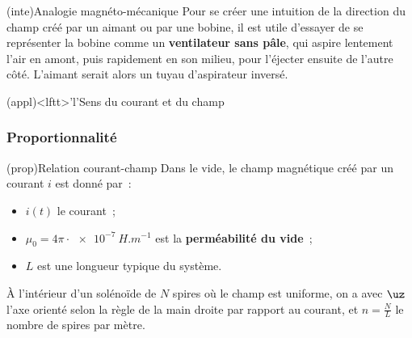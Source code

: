 \documentclass[../../main/main.tex]{subfiles}
\begin{document}
\begin{tcb*}(inte){Analogie magnéto-mécanique}
	Pour se créer une intuition de la direction du champ créé par un aimant ou par
	une bobine, il est utile d'essayer de se représenter la bobine comme un
	\textbf{ventilateur sans pâle}, qui aspire lentement l'air en amont, puis
	rapidement en son milieu, pour l'éjecter ensuite de l'autre côté. L'aimant
	serait alors un tuyau d'aspirateur inversé.
\end{tcb*}

\begin{tcb}(appl)<lftt>'l'{Sens du courant et du champ}
	\centering
\end{tcb}

\subsubsection{Proportionnalité}
\label{sssec:prop}
\begin{tcb*}[sidebyside, righthand ratio=.35](prop){Relation courant-champ}
	Dans le vide, le champ magnétique créé par un courant $i$ est donné par~:
	\psw{%
		\[
			\boxed{\norm{\Bf} = \mu_0 \frac{i(t)}{L}}
		\]
	}%
	\vspace{-15pt}
	\begin{itemize}
		\item $i (t)$ le courant~;
		\item $\mu_0 = 4\pi\cdot \SI{e-7}{H.m ^{-1}}$ est la \textbf{perméabilité du
			      vide}~;
		\item $L$ est une longueur typique du système.
	\end{itemize}
	\tcblower
	À l'intérieur d'un solénoïde de $N$ spires où le champ est uniforme, on a
	\psw{%
		\[
			\boxed{\Bf = \mu_0ni (t)\uz}
		\]
	}%
	avec $\uz$ l'axe orienté selon la règle de la main droite par
	rapport au courant, et $n = \frac{N}{L}$ le nombre de spires par mètre.
\end{tcb*}
\end{document}
